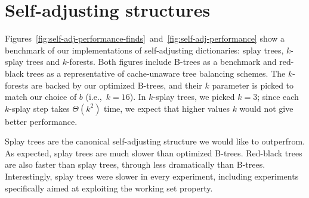 \section{Self-adjusting structures}
Figures~\ref{fig:self-adj-performance-finds}~and~\ref{fig:self-adj-performance}
show a benchmark of our implementations of self-adjusting dictionaries:
splay trees, $k$-splay trees and $k$-forests.
Both figures include B-trees as a benchmark and red-black trees as a
representative of cache-unaware tree balancing schemes.
The $k$-forests are backed by our optimized B-trees, and their $k$ parameter
is picked to match our choice of $b$ (i.e.,\ $k=16$).
In $k$-splay trees, we picked $k=3$; since each $k$-splay step takes
$\Theta(k^2)$ time, we expect that higher values $k$ would not give better
performance.  %

Splay trees are the canonical self-adjusting structure we would like to
outperfrom. As expected, splay trees are much slower than optimized B-trees.
Red-black trees are also faster than splay trees, through less dramatically
than B-trees. Interestingly, splay trees were slower in every experiment,
including experiments specifically aimed at exploiting the working set
property.

